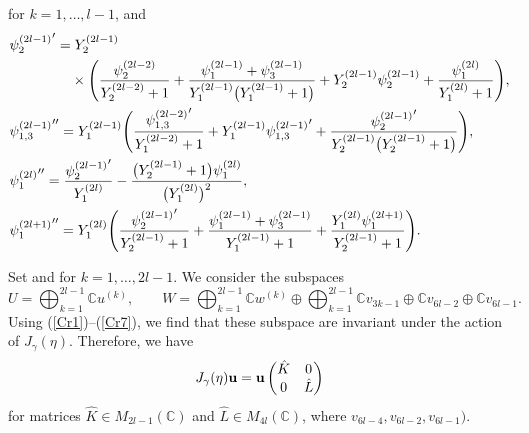 \documentclass[10pt,a4paper]{amsart}
\numberwithin{equation}{section}
\newcommand{\C}{{\mathbb C}}
\newcommand{\op}{\oplus}
\newcommand{\Op}{\bigoplus}
\begin{document}
	for $k=1,\dots,l-1$, and
		\begin{align}
		\label{Cr5}&{\psi_2^{(2l-1)}}^\prime=Y_2^{(2l-1)}\\
&\nonumber\hphantom{{\psi_2^{(2l-1)}}^\prime=}{}\times
\Biggl(\frac{\psi_2^{(2l-2)}}{Y_2^{(2l-2)}+1}+\frac{\psi_1^{(2l-1)}+\psi_3^{(2l-1)}}{Y_1^{(2l-1)}\bigl(Y_1^{(2l-1)}+1\bigr)}+Y_2^{(2l-1)}\psi_2^{(2l-1)}+\frac{\psi_1^{(2l)}}{Y_1^{(2l)}+1}\Biggr),\\
		\label{Crp5}&{\psi_{1,3}^{(2l-1)}}^{\prime\prime}=Y_1^{(2l-1)}\Biggl(\frac{{\psi_{1,3}^{(2l-2)}}^\prime}{Y_1^{(2l-2)}+1}+Y_1^{(2l-1)}{\psi_{1,3}^{(2l-1)}}^\prime+\frac{{\psi_2^{(2l-1)}}^\prime}{Y_2^{(2l-1)}\bigl(Y_2^{(2l-1)}+1\bigr)}\Biggr),\\
		\label{Cr6}&{\psi_1^{(2l)}}^{\prime\prime}=\frac{{\psi_2^{(2l-1)}}^\prime}{Y_1^{(2l)}}-\frac{\bigl(Y_2^{(2l-1)}+1\bigr)\psi_1^{(2l)}}{\bigl(Y_1^{(2l)}\bigr)^2},\\
		\label{Cr7}&{\psi_1^{(2l+1)}}^{\prime\prime}=Y_1^{(2l)}\Biggl(\frac{{\psi_2^{(2l-1)}}^\prime}{Y_2^{(2l-1)}+1}+\frac{\psi_1^{(2l-1)}+\psi_3^{(2l-1)}}{Y_1^{(2l-1)}+1}+\frac{Y_1^{(2l)}\psi_1^{(2l+1)}}{Y_2^{(2l-1)}+1}\Biggr).
		\end{align}

Set  and  for $k=1,\dots, 2l-1$.
We consider the subspaces
	\[U=\Op_{k=1}^{2l-1}\C u^{(k)},\qquad W=\Op_{k=1}^{2l-1}\C w^{(k)}\op\Op_{k=1}^{2l-1}\C v_{3k-1}\op\C v_{6l-2}\op\C v_{6l-1}.\]
Using (\ref{Cr1})--(\ref{Cr7}), we find that these subspace are invariant under the action of $J_\gamma(\eta)$.
Therefore, we have
	\begin{align*}
	J_\gamma(\eta){\bf u}={\bf u}
		\begin{pmatrix}
		\hat{K}&0\\
		0&\hat{L}
		\end{pmatrix}
	\end{align*}
for matrices $\hat{K}\in M_{2l-1}(\C)$ and $\hat{L}\in M_{4l}(\C)$, where  $v_{6l-4},v_{6l-2},v_{6l-1}\bigr)$.
\end{document}
